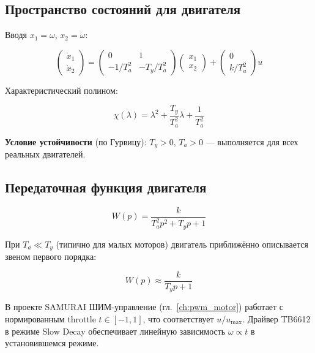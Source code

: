 \subsection{Пространство состояний для двигателя}

Вводя $x_1 = \omega$, $x_2 = \dot{\omega}$:

\begin{equation}
  \begin{pmatrix} \dot{x}_1 \\ \dot{x}_2 \end{pmatrix}
  = \begin{pmatrix} 0 & 1 \\ -1/T_a^2 & -T_y/T_a^2 \end{pmatrix}
  \begin{pmatrix} x_1 \\ x_2 \end{pmatrix}
  + \begin{pmatrix} 0 \\ k/T_a^2 \end{pmatrix} u
  \label{eq:motor_ss}
\end{equation}

Характеристический полином:

\begin{equation}
  \chi(\lambda) = \lambda^2 + \frac{T_y}{T_a^2}\lambda + \frac{1}{T_a^2}
  \label{eq:motor_char}
\end{equation}

\textbf{Условие устойчивости} (по Гурвицу): $T_y > 0$, $T_a > 0$ ---
выполняется для всех реальных двигателей.

\subsection{Передаточная функция двигателя}

\begin{equation}
  W(p) = \frac{k}{T_a^2 p^2 + T_y p + 1}
  \label{eq:motor_tf}
\end{equation}

При $T_a \ll T_y$ (типично для малых моторов) двигатель приближённо
описывается звеном первого порядка:

\begin{equation}
  W(p) \approx \frac{k}{T_y p + 1}
  \label{eq:motor_tf_approx}
\end{equation}

\begin{notebox}
В проекте SAMURAI ШИМ-управление (гл.~\ref{ch:pwm_motor})
работает с нормированным throttle $t \in [-1, 1]$, что соответствует
$u/u_{\max}$. Драйвер TB6612 в режиме Slow Decay обеспечивает
линейную зависимость $\omega \propto t$ в установившемся режиме.
\end{notebox}

